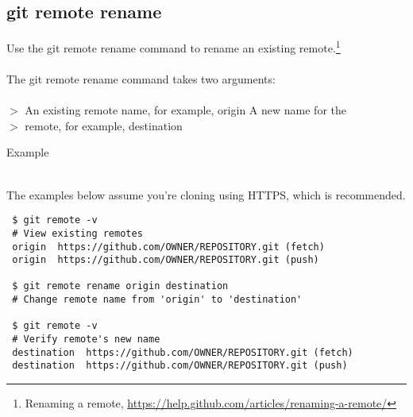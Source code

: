 

\newpage
\subsection{git remote rename}
Use the git remote rename command to rename an existing remote.\footnote{Renaming a remote,
\href{https://help.github.com/articles/renaming-a-remote/}{https://help.github.com/articles/renaming-a-remote/}}
\\
\\
The git remote rename command takes two arguments:
\\
\\
$>$ An existing remote name, for example, origin A new name for the\\
$>$ remote, for example, destination

\noindent \begin{bf}Example\end{bf}\\
The examples below assume you're cloning using HTTPS, which is recommended.

\begin{Verbatim}
 $ git remote -v
 # View existing remotes
 origin  https://github.com/OWNER/REPOSITORY.git (fetch)
 origin  https://github.com/OWNER/REPOSITORY.git (push)

 $ git remote rename origin destination
 # Change remote name from 'origin' to 'destination'

 $ git remote -v
 # Verify remote's new name
 destination  https://github.com/OWNER/REPOSITORY.git (fetch)
 destination  https://github.com/OWNER/REPOSITORY.git (push)
\end{Verbatim}
